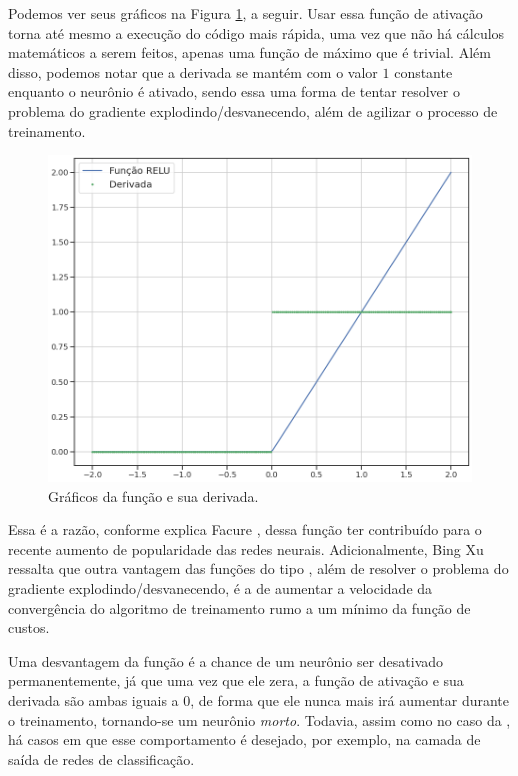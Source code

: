 Podemos ver seus gráficos na Figura \ref{fig:relu}, a seguir. Usar essa função de ativação torna até mesmo a execução do código mais rápida, uma vez que não há cálculos matemáticos a serem feitos, apenas uma função de máximo que é trivial. Além disso, podemos notar que a derivada se mantém com o valor $1$ constante enquanto o neurônio é ativado, sendo essa uma forma de tentar resolver o problema do gradiente explodindo/desvanecendo, além de agilizar o processo de treinamento. 

\begin{figure}[htb]
\centering
\includegraphics[width=12cm]{figuras/relu}
\caption{Gráficos da função  e sua derivada.}
\label{fig:relu}
\end{figure}

Essa é a razão, conforme explica Facure \citep{matheus}, dessa função ter contribuído para o recente aumento de popularidade das redes neurais. Adicionalmente, Bing Xu \citep{xu_relu} ressalta que outra vantagem das funções do tipo , além de resolver o problema do gradiente explodindo/desvanecendo, é a de aumentar a velocidade da convergência do algoritmo de treinamento rumo a um mínimo da função de custos.

Uma desvantagem da função  é a chance de um neurônio ser desativado permanentemente, já que uma vez que ele zera, a função de ativação e sua derivada são ambas iguais a $0$, de forma que ele nunca mais irá aumentar durante o treinamento, tornando-se um neurônio \emph{morto}. Todavia, assim como no caso da , há casos em que esse comportamento é desejado, por exemplo, na camada de saída de redes de classificação.

